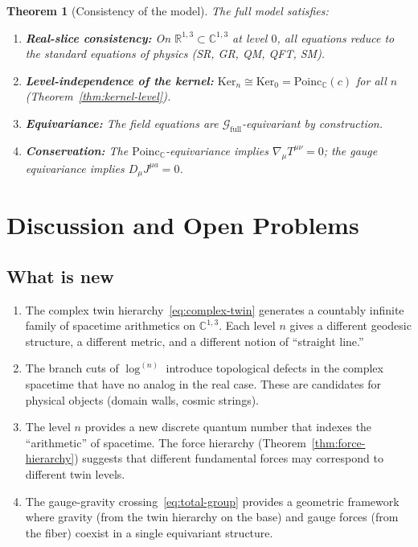 \documentclass[12pt]{article}
\theoremstyle{plain}
\newtheorem{theorem}{Theorem}[section]
\theoremstyle{definition}
\theoremstyle{remark}
\newcommand{\Ker}{\mathrm{Ker}}
\newcommand{\Poinc}{\mathrm{Poinc}}
\newcommand{\CC}{\mathbb{C}}
\newcommand{\RR}{\mathbb{R}}
\begin{document}
\begin{theorem}[Consistency of the model]\label{thm:consistency}
The full model satisfies:
\begin{enumerate}[label=(\alph*)]
    \item \textbf{Real-slice consistency:} On $\RR^{1,3} \subset \CC^{1,3}$ at level $0$, all equations reduce to the standard equations of physics (SR, GR, QM, QFT, SM).
    \item \textbf{Level-independence of the kernel:} $\Ker_n \cong \Ker_0 = \Poinc_\CC(c)$ for all $n$ (Theorem~\ref{thm:kernel-level}).
    \item \textbf{Equivariance:} The field equations are $\mathcal{G}_{\mathrm{full}}$-equivariant by construction.
    \item \textbf{Conservation:} The $\Poinc_\CC$-equivariance implies $\nabla_\mu T^{\mu\nu} = 0$; the gauge equivariance implies $D_\mu J^{\mu a} = 0$.
\end{enumerate}
\end{theorem}


\section{Discussion and Open Problems}
\label{sec:discussion}

\subsection{What is new}

\begin{enumerate}[label=(\roman*)]
    \item The complex twin hierarchy~\eqref{eq:complex-twin} generates a countably infinite family of spacetime arithmetics on $\CC^{1,3}$. Each level $n$ gives a different geodesic structure, a different metric, and a different notion of ``straight line.''
    
    \item The branch cuts of $\log^{(n)}$ introduce topological defects in the complex spacetime that have no analog in the real case. These are candidates for physical objects (domain walls, cosmic strings).
    
    \item The level $n$ provides a new discrete quantum number that indexes the ``arithmetic'' of spacetime. The force hierarchy (Theorem~\ref{thm:force-hierarchy}) suggests that different fundamental forces may correspond to different twin levels.
    
    \item The gauge-gravity crossing~\eqref{eq:total-group} provides a geometric framework where gravity (from the twin hierarchy on the base) and gauge forces (from the fiber) coexist in a single equivariant structure.
\end{enumerate}
\end{document}
